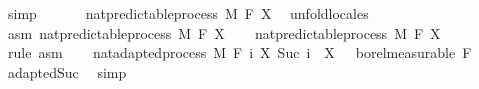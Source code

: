 \begin{isabellebody}
\ simp\isanewline
\ \ \isamarkupfalse%
\isanewline
\ \ \isamarkupfalse%
\ {\isachardoublequoteopen}nat{\isacharunderscore}{\kern0pt}predictable{\isacharunderscore}{\kern0pt}process\ M\ F\ X{\isachardoublequoteclose}\ \isamarkupfalse%
\ {\isacharparenleft}{\kern0pt}unfold{\isacharunderscore}{\kern0pt}locales{\isacharparenright}{\kern0pt}\isanewline
{}\isamarkupfalse%
\isanewline
\ \ \isamarkupfalse%
\ asm{\isacharcolon}{\kern0pt}\ {\isachardoublequoteopen}nat{\isacharunderscore}{\kern0pt}predictable{\isacharunderscore}{\kern0pt}process\ M\ F\ X{\isachardoublequoteclose}\isanewline
\ \ \isamarkupfalse%
\ nat{\isacharunderscore}{\kern0pt}predictable{\isacharunderscore}{\kern0pt}process\ M\ F\ X\ \isamarkupfalse%
\ {\isacharparenleft}{\kern0pt}rule\ asm{\isacharparenright}{\kern0pt}\isanewline
\ \ \isamarkupfalse%
\ {\isachardoublequoteopen}nat{\isacharunderscore}{\kern0pt}adapted{\isacharunderscore}{\kern0pt}process\ M\ F\ {\isacharparenleft}{\kern0pt}{\isasymlambda}i{\isachardot}{\kern0pt}\ X\ {\isacharparenleft}{\kern0pt}Suc\ i{\isacharparenright}{\kern0pt}{\isacharparenright}{\kern0pt}\ {\isasymand}\ X\ {}\ {\isasymin}\ borel{\isacharunderscore}{\kern0pt}measurable\ {\isacharparenleft}{\kern0pt}F\ {}{\isacharparenright}{\kern0pt}{\isachardoublequoteclose}\ \isamarkupfalse%
\ adapted{\isacharunderscore}{\kern0pt}Suc\ \isamarkupfalse%
\ simp\isanewline
{}\isamarkupfalse%
%
\endisatagproof
{\isafoldproof}%
%
\isadelimproof
\isanewline
%
\endisadelimproof
%
\isadelimtheory
\ \ \ \ \ \ \ \ \ \ \ \ \ \ \ \ \ \ \ \ \ \ \ \ \ \ \ \ \ \ \ \ \ \ \ \ \ \ \ \ \ \ \ \ \ \ \ \ \ \ \ \ \ \ \ \ \ \ \ \ \ \ \ \ \ \ \ \ \ \ \ \ \ \ \ \ \isanewline
%
\endisadelimtheory
%
\isatagtheory
{}\isamarkupfalse%
%
\endisatagtheory
{\isafoldtheory}%
%
\isadelimtheory
%
\endisadelimtheory
%
\end{isabellebody}%
\endinput
